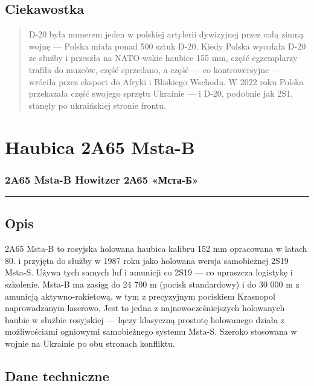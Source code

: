 \documentclass[12pt,openany,oneside]{book}
\begin{document}
\section{Ciekawostka}\label{ciekawostka-20}

\begin{quote}
D-20 była numerem jeden w polskiej artylerii dywizyjnej przez całą zimną
wojnę --- Polska miała ponad 500 sztuk D-20. Kiedy Polska wycofała D-20
ze służby i przeszła na NATO-wskie haubice 155 mm, część egzemplarzy
trafiła do muzeów, część sprzedano, a część --- co kontrowersyjne ---
wróciła przez eksport do Afryki i Bliskiego Wschodu. W 2022 roku Polska
przekazała część swojego sprzętu Ukrainie --- i D-20, podobnie jak 2S1,
stanęły po ukraińskiej stronie frontu.
\end{quote}

\chapter{Haubica 2A65 Msta-B}\label{haubica-2a65-msta-b}

\subsection{2A65 Msta-B Howitzer \textbar{} 2А65
«Мста-Б»}\label{a65-msta-b-howitzer-2ux43065-ux43cux441ux442ux430-ux431}

\begin{center}\rule{0.5\linewidth}{0.5pt}\end{center}

\section{Opis}\label{opis-21}

2A65 Msta-B to rosyjska holowana haubica kalibru 152 mm opracowana w
latach 80. i przyjęta do służby w 1987 roku jako holowana wersja
samobieżnej 2S19 Msta-S. Używa tych samych luf i amunicji co 2S19 --- co
upraszcza logistykę i szkolenie. Msta-B ma zasięg do 24 700 m (pocisk
standardowy) i do 30 000 m z amunicją aktywno-rakietową, w tym z
precyzyjnym pociskiem Krasnopol naprowadzanym laserowo. Jest to jedna z
najnowocześniejszych holowanych haubic w służbie rosyjskiej --- łączy
klasyczną prostotę holowanego działa z możliwościami ogniowymi
samobieżnego systemu Msta-S. Szeroko stosowana w wojnie na Ukrainie po
obu stronach konfliktu.

\section{Dane techniczne}\label{dane-techniczne-21}
\end{document}
